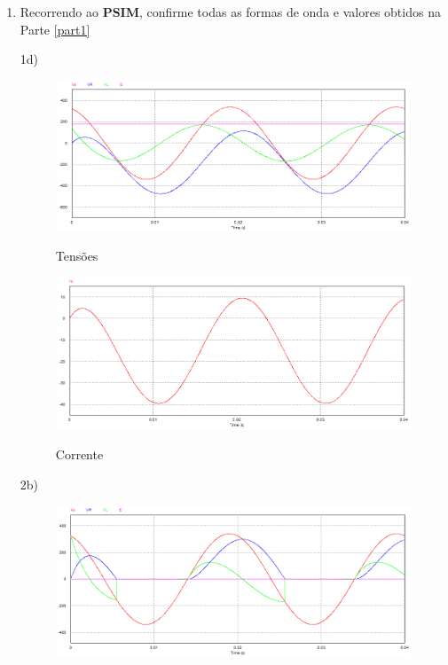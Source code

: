\documentclass[titlepage, a4paper, 11pt, reqno, openany]{report}
\begin{document}
\begin{enumerate}
\item
Recorrendo ao {\bf PSIM}, confirme todas as formas de onda e valores obtidos na Parte \ref{part1} \par
%
1d) \par
\begin{figure}[H]
\centering
\includegraphics[width=0.90\linewidth]{./image/PSIMP2_1_1.png}\\
\caption{Tens\~{o}es}
\label{grafico 6}
\end{figure}\par
%
\begin{figure}[H]
\centering
\includegraphics[width=0.90\linewidth]{./image/PSIMP2_1_2.png}\\
\caption{Corrente}
\label{grafico 7}
\end{figure}\par
%
2b)
%
\begin{figure}[H]
\centering
\includegraphics[width=0.90\linewidth]{./image/PSIMP2_1_3.png}\\

\end{figure}
\end{enumerate}
\end{document}
